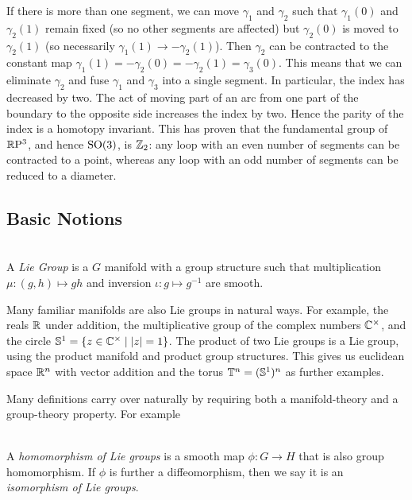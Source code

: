 If there is more than one segment, we can move $\gamma_1$ and $\gamma_2$ such that $\gamma_1(0)$ and $\gamma_2(1)$ remain fixed (so no other segments are affected) but $\gamma_2(0)$ is moved to $\gamma_2(1)$ (so necessarily $\gamma_1(1) \to - \gamma_2(1)$).
Then $\gamma_2$ can be contracted to the constant map $\gamma_1(1) = -\gamma_2(0) = -\gamma_2(1) = \gamma_3(0)$.
This means that we can eliminate $\gamma_2$ and fuse $\gamma_1$ and $\gamma_3$ into a single segment.
In particular, the index has decreased by two.
The act of moving part of an arc from one part of the boundary to the opposite side increases the index by two.
Hence the parity of the index is a homotopy invariant.
This has proven that the fundamental group of $\mathbb{R}\mathrm{P}^3$, and hence $\mathrm{SO}(3)$, is $\mathbb{Z}_2$:
any loop with an even number of segments can be contracted to a point, whereas any loop with an odd number of segments can be reduced to a diameter.


\subsection{Basic Notions}

\begin{definition}
\label{def:lie group}
\textup{\cite[3.1]{Warner1983}\cite[Definition~1.20]{Hall2015}} \\
A \emph{Lie Group} is a $G$ manifold with a group structure such that multiplication $\mu : (g,h) \mapsto gh$ and inversion $\iota : g \mapsto g^{-1}$ are smooth.
\end{definition}

Many familiar manifolds are also Lie groups in natural ways.
For example, the reals $\mathbb{R}$ under addition, the multiplicative group of the complex numbers $\mathbb{C}^\times$, and the circle $\mathbb{S}^1 = \{ z \in \mathbb{C}^\times \mid |z| = 1 \}$.
The product of two Lie groups is a Lie group, using the product manifold and product group structures.
This gives us euclidean space $\mathbb{R}^n$ with vector addition and the torus $\mathbb{T}^n = (\mathbb{S}^1)^n$ as further examples.

Many definitions carry over naturally by requiring both a manifold-theory and a group-theory property.
For example
\begin{definition}
\textup{\cite[3.13]{Warner1983}} \\
A \emph{homomorphism of Lie groups} is a smooth map $\phi : G \to H$ that is also group homomorphism.
If $\phi$ is further a diffeomorphism, then we say it is an \emph{isomorphism of Lie groups}.
\end{definition}



